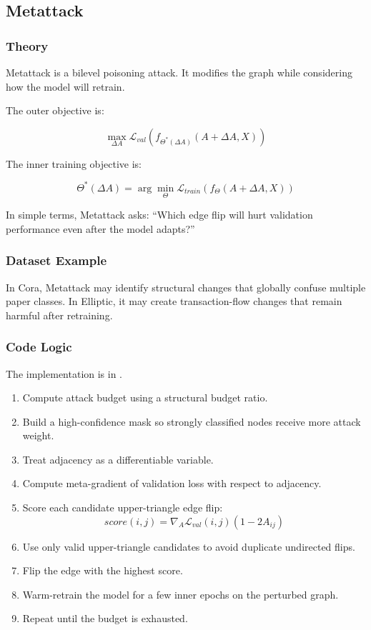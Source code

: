 \documentclass[12pt,a4paper]{article}
\begin{document}
\subsection{Metattack}
\subsubsection{Theory}
Metattack is a bilevel poisoning attack. It modifies the graph while considering how the model will retrain.

The outer objective is:

$$
\max_{\Delta A}\mathcal{L}_{val}(f_{\Theta^*(\Delta A)}(A+\Delta A,X))
$$

The inner training objective is:

$$
\Theta^*(\Delta A)=\arg\min_\Theta \mathcal{L}_{train}(f_\Theta(A+\Delta A,X))
$$

In simple terms, Metattack asks: ``Which edge flip will hurt validation performance even after the model adapts?''

\subsubsection{Dataset Example}
In Cora, Metattack may identify structural changes that globally confuse multiple paper classes. In Elliptic, it may create transaction-flow changes that remain harmful after retraining.

\subsubsection{Code Logic}
The implementation is in .

\begin{enumerate}
    \item Compute attack budget using a structural budget ratio.
    \item Build a high-confidence mask so strongly classified nodes receive more attack weight.
    \item Treat adjacency as a differentiable variable.
    \item Compute meta-gradient of validation loss with respect to adjacency.
    \item Score each candidate upper-triangle edge flip:
    $$
    score(i,j)=\nabla_A\mathcal{L}_{val}(i,j)(1-2A_{ij})
    $$
    \item Use only valid upper-triangle candidates to avoid duplicate undirected flips.
    \item Flip the edge with the highest score.
    \item Warm-retrain the model for a few inner epochs on the perturbed graph.
    \item Repeat until the budget is exhausted.
\end{enumerate}
\end{document}
